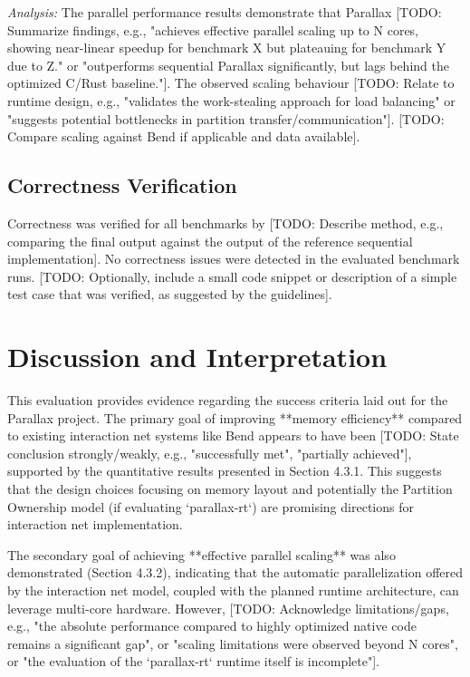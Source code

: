 \textit{Analysis:} The parallel performance results demonstrate that Parallax [TODO: Summarize findings, e.g., "achieves effective parallel scaling up to N cores, showing near-linear speedup for benchmark X but plateauing for benchmark Y due to Z." or "outperforms sequential Parallax significantly, but lags behind the optimized C/Rust baseline."]. The observed scaling behaviour [TODO: Relate to runtime design, e.g., "validates the work-stealing approach for load balancing" or "suggests potential bottlenecks in partition transfer/communication"]. [TODO: Compare scaling against Bend if applicable and data available].

\subsection{Correctness Verification} %
Correctness was verified for all benchmarks by [TODO: Describe method, e.g., comparing the final output against the output of the reference sequential implementation]. No correctness issues were detected in the evaluated benchmark runs. [TODO: Optionally, include a small code snippet or description of a simple test case that was verified, as suggested by the guidelines].

\section{Discussion and Interpretation} %
This evaluation provides evidence regarding the success criteria laid out for the Parallax project. The primary goal of improving **memory efficiency** compared to existing interaction net systems like Bend appears to have been [TODO: State conclusion strongly/weakly, e.g., "successfully met", "partially achieved"], supported by the quantitative results presented in Section 4.3.1. This suggests that the design choices focusing on memory layout and potentially the Partition Ownership model (if evaluating `parallax-rt`) are promising directions for interaction net implementation.

The secondary goal of achieving **effective parallel scaling** was also demonstrated (Section 4.3.2), indicating that the automatic parallelization offered by the interaction net model, coupled with the planned runtime architecture, can leverage multi-core hardware. However, [TODO: Acknowledge limitations/gaps, e.g., "the absolute performance compared to highly optimized native code remains a significant gap", or "scaling limitations were observed beyond N cores", or "the evaluation of the `parallax-rt` runtime itself is incomplete"].

